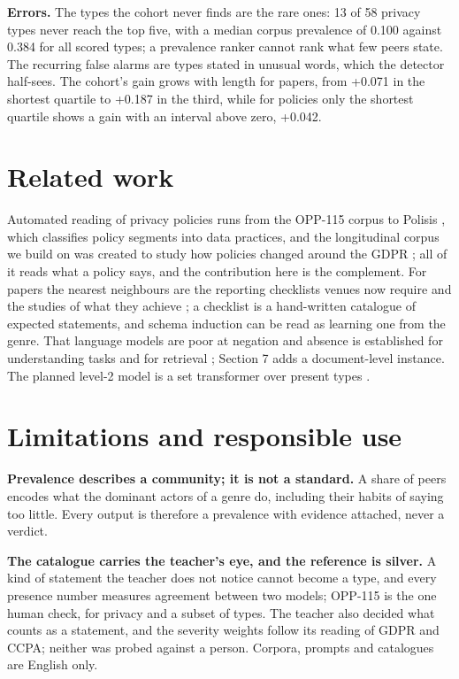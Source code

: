 \documentclass[11pt,a4paper]{article}
\begin{document}
\textbf{Errors.} The types the cohort never finds are the rare ones: 13 of 58 privacy types never reach the top five, with a median corpus prevalence of 0.100 against 0.384 for all scored types; a prevalence ranker cannot rank what few peers state.  The recurring false alarms are types stated in unusual words, which the detector half-sees. The cohort's gain grows with length for papers, from +0.071 in the shortest quartile to +0.187 in the third, while for policies only the shortest quartile shows a gain with an interval above zero, +0.042.

\section{Related work}

Automated reading of privacy policies runs from the OPP-115 corpus \cite{r6} to Polisis \cite{r27}, which classifies policy segments into data practices, and the longitudinal corpus we build on was created to study how policies changed around the GDPR \cite{r5}; all of it reads what a policy says, and the contribution here is the complement. For papers the nearest neighbours are the reporting checklists venues now require \cite{r28,r12,r13} and the studies of what they achieve \cite{r29}; a checklist is a hand-written catalogue of expected statements, and schema induction can be read as learning one from the genre. That language models are poor at negation and absence is established for understanding tasks \cite{r1,r2} and for retrieval \cite{r3}; Section 7 adds a document-level instance. The planned level-2 model is a set transformer over present types \cite{r30}.

\section{Limitations and responsible use}

\textbf{Prevalence describes a community; it is not a standard.} A share of peers encodes what the dominant actors of a genre do, including their habits of saying too little. Every output is therefore a prevalence with evidence attached, never a verdict.

\textbf{The catalogue carries the teacher's eye, and the reference is silver.} A kind of statement the teacher does not notice cannot become a type, and every presence number measures agreement between two models; OPP-115 is the one human check, for privacy and a subset of types. The teacher also decided what counts as a statement, and the severity weights follow its reading of GDPR and CCPA; neither was probed against a person. Corpora, prompts and catalogues are English only.
\end{document}
